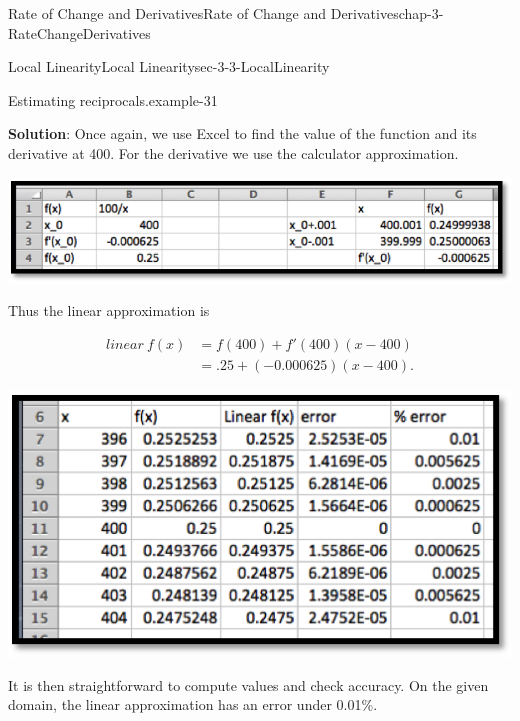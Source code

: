 \documentclass[oneside,10pt,]{book}
\newcommand{\terminology}[1]{\textbf{#1}}
\numberwithin{equation}{section}
\newcommand{\amp}{&}
\begin{document}
\begin{chapterptx}{Rate of Change and Derivatives}{}{Rate of Change and Derivatives}{}{}{chap-3-RateChangeDerivatives}
\begin{sectionptx}{Local Linearity}{}{Local Linearity}{}{}{sec-3-3-LocalLinearity}
\begin{example}{Estimating reciprocals.}{example-31}
\par
\hypertarget{p-1150}{}%
\terminology{Solution}:  Once again, we use Excel to find the value of the function and its derivative at 400.  For the derivative we use the calculator approximation.%
\begin{sidebyside}{1}{0.15}{0.15}{0}%
\begin{sbspanel}{0.7}%
\includegraphics[width=1\linewidth]{images/sec3-3-7.png}
\end{sbspanel}%
\end{sidebyside}%
\par
\hypertarget{p-1151}{}%
Thus the linear approximation is%
\par
\hypertarget{p-1152}{}%
%
\begin{equation*}
\begin{aligned} linear\ f(x) \amp = 
f(400)+f'(400)(x-400) \\ 
\amp =.25+(-0.000625)(x-400). \end{aligned}
\end{equation*}
%
\begin{sidebyside}{1}{0.2}{0.2}{0}%
\begin{sbspanel}{0.6}%
\includegraphics[width=1\linewidth]{images/sec3-3-8.png}
\end{sbspanel}%
\end{sidebyside}%
\par
\hypertarget{p-1153}{}%
It is then straightforward to compute values and check accuracy.  On the given domain, the linear approximation has an error under 0.01\%.%
\end{example}

\end{sectionptx}
\end{chapterptx}
\end{document}
